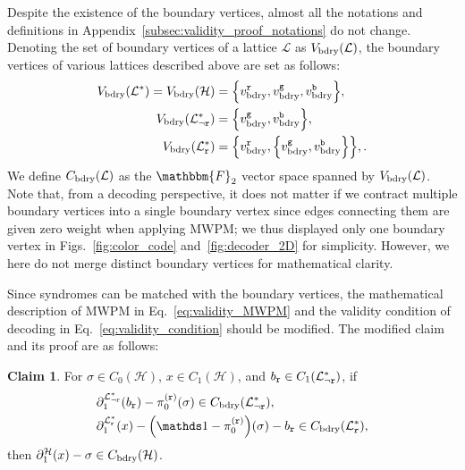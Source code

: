 \documentclass[a4paper,twocolumn,11pt,accepted=2025-01-21]{quantumarticle}
\theoremstyle{definition}
\theoremstyle{definition}
\theoremstyle{definition}
\newtheorem{claim}{Claim}
\begin{document}
Despite the existence of the boundary vertices, almost all the notations and definitions in Appendix~\ref{subsec:validity_proof_notations} do not change.
Denoting the set of boundary vertices of a lattice $\mathcal{L}$ as $V_{\mathrm{bdry}}(\mathcal{L})$, the boundary vertices of various lattices described above are set as follows:
\begin{align*}
    V_{\mathrm{bdry}}\qty(\mathcal{L}^*) = V_{\mathrm{bdry}}\qty(\mathcal{H}) &= \qty{v_{\mathrm{bdry}}^{\texttt{r}}, v_{\mathrm{bdry}}^{\texttt{g}}, v_{\mathrm{bdry}}^{\texttt{b}}}, \\
    V_{\mathrm{bdry}}\qty(\mathcal{L}_{\neg \texttt{r}}^*) &= \qty{v_{\mathrm{bdry}}^{\texttt{g}}, v_{\mathrm{bdry}}^{\texttt{b}}},  \\
    V_{\mathrm{bdry}}\qty(\mathcal{L}_{\texttt{r}}^*) &= \qty{v_{\mathrm{bdry}}^{\texttt{r}}, \qty{v_{\mathrm{bdry}}^{\texttt{g}}, v_{\mathrm{bdry}}^{\texttt{b}}}},.
\end{align*}
We define $C_{\mathrm{bdry}}\qty(\mathcal{L})$ as the $\mathbbm{F}_2$ vector space spanned by $V_{\mathrm{bdry}}\qty(\mathcal{L})$.
Note that, from a decoding perspective, it does not matter if we contract multiple boundary vertices into a single boundary vertex since edges connecting them are given zero weight when applying MWPM; we thus displayed only one boundary vertex in Figs.~\ref{fig:color_code} and~\ref{fig:decoder_2D} for simplicity.
However, we here do not merge distinct boundary vertices for mathematical clarity.

Since syndromes can be matched with the boundary vertices, the mathematical description of MWPM in Eq.~\eqref{eq:validity_MWPM} and the validity condition of decoding in Eq.~\eqref{eq:validity_condition} should be modified.
The modified claim and its proof are as follows:
\begin{claim}
    For $\sigma \in C_0 (\mathcal{H})$, $x \in C_1 (\mathcal{H})$, and $b_{\texttt{r}} \in C_1(\mathcal{L}_{\neg \texttt{r}}^*)$, if 
    \begin{subequations}
    \begin{align}
        &\partial_1^{\LatticeRest{\rbs}}\qty(b_\rbs) - \pi_0^{(\rbs)}(\sigma) \in C_\mr{bdry}\qty(\LatticeRest{\rbs}), \label{eq:validity_MWPM_bdry_step1}\\
        &\partial_1^{\LatticeMono{\rbs}}(x) - \qty(\identity - \pi_0^{(\rbs)})(\sigma) - b_\rbs \in C_\mr{bdry}\qty(\LatticeMono{\rbs}), \label{eq:validity_MWPM_bdry_step2}
    \end{align}
    \label{eq:validity_MWPM_bdry}
    \end{subequations}
    then $\partial_1^{\mathcal{H}}(x) - \sigma \in C_{\mathrm{bdry}}(\mathcal{H})$.
\end{claim}
\end{document}

